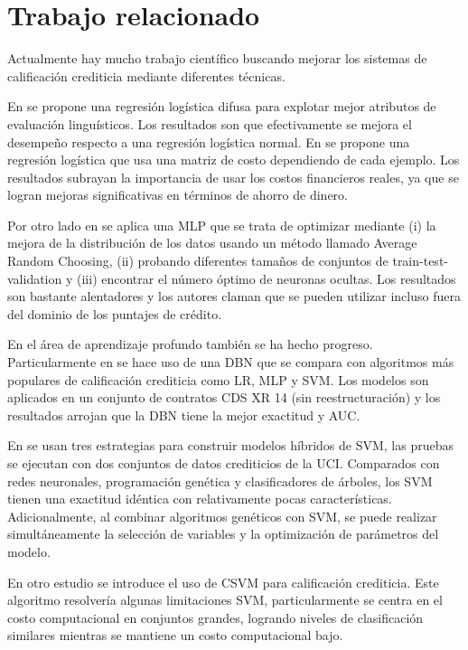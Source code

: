\section{Trabajo relacionado}

Actualmente hay mucho trabajo científico buscando mejorar los sistemas de calificación crediticia mediante diferentes técnicas.

En \cite{sohn2016technology} se propone una regresión logística difusa para explotar mejor atributos de evaluación linguísticos. Los resultados son que efectivamente se mejora el desempeño respecto a una regresión logística normal. En \cite{bahnsen2014example} se propone una regresión logística que usa una matriz de costo dependiendo de cada ejemplo. Los resultados subrayan la importancia de usar los costos financieros reales, ya que se logran mejoras significativas en términos de ahorro de dinero.

Por otro lado en \cite{zhao2015investigation} se aplica una \ac{MLP} que se trata de optimizar mediante (i) la mejora de la distribución de los datos usando un método llamado Average Random Choosing, (ii) probando diferentes tamaños de conjuntos de train-test-validation y (iii) encontrar el número óptimo de neuronas ocultas. Los resultados son bastante alentadores y los autores claman que se pueden utilizar incluso fuera del dominio de los puntajes de crédito.

En el área de aprendizaje profundo también se ha hecho progreso. Particularmente en \cite{luo2017deep} se hace uso de una \ac{DBN} que se compara con algoritmos más populares de calificación crediticia como \ac{LR}, \ac{MLP} y \ac{SVM}. Los modelos son aplicados en un conjunto de contratos CDS XR 14 (sin reestructuración) y los resultados arrojan que la \ac{DBN} tiene la mejor exactitud y AUC.

En \cite{huang2007credit} se usan tres estrategias para construir modelos híbridos de \ac{SVM}, las pruebas se ejecutan con dos conjuntos de datos crediticios de la UCI. Comparados con redes neuronales, programación genética y clasificadores de árboles, los \ac{SVM} tienen una exactitud idéntica con relativamente pocas características. Adicionalmente, al combinar algoritmos genéticos con \ac{SVM}, se puede realizar simultáneamente la selección de variables y la optimización de parámetros del modelo. 

En otro estudio \cite{harris2015credit} se introduce el uso de \ac{CSVM} para calificación crediticia. Este algoritmo resolvería algunas limitaciones \ac{SVM}, particularmente se centra en el costo computacional en conjuntos grandes, logrando niveles de clasificación similares mientras se mantiene un costo computacional bajo.

